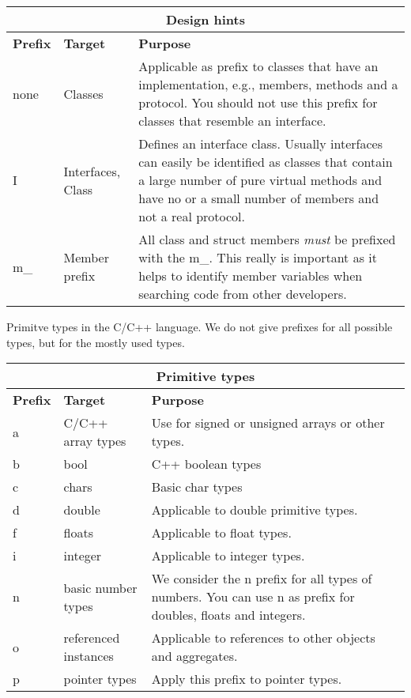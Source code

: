 \begin{tabular}{|l|l|p{10cm}|}
\multicolumn{3}{c}{\textbf{Design hints}}\\\hline
\textbf{Prefix} & \textbf{Target} & \textbf{Purpose} \\\hline

none   & Classes & Applicable as prefix to classes that have an implementation,
              e.g., members, methods and a protocol. You should not use
              this prefix for classes that resemble an interface.\\\hline
I   & Interfaces, Class & Defines an interface class. Usually interfaces
                        can easily be identified as classes that contain
                        a large number of pure virtual methods and have
                        no or a small number of members and not a real
                        protocol.\\\hline
m\_ & Member prefix & All class and struct members \emph{must} be prefixed
                      with the m\_. This really is important as it helps
                      to identify member variables when searching code
                      from other developers.\\\hline
\end{tabular}

Primitve types in the C/C++ language. 
We do not give prefixes for all possible types, but for the mostly used types.

\begin{tabular}{|l|l|p{10cm}|}
\multicolumn{3}{c}{\textbf{Primitive types}}\\\hline
\textbf{Prefix} & \textbf{Target} & \textbf{Purpose} \\\hline
a   & C/C++ array types & Use for signed or unsigned arrays or other types.\\\hline
b   & bool               & C++ boolean types\\\hline
c   & chars & Basic char types\\\hline
d   & double & Applicable to double primitive types.\\\hline
f   & floats & Applicable to float types.\\\hline
i   & integer & Applicable to integer types. \\\hline
n   & basic number types & We consider the n prefix for all types of numbers.
                          You can use n as prefix for doubles, floats and
                          integers.\\\hline
o   & referenced instances & Applicable to references to other objects
                           and aggregates.\\\hline
p   & pointer types & Apply this prefix to pointer types.\\\hline
\end{tabular}

